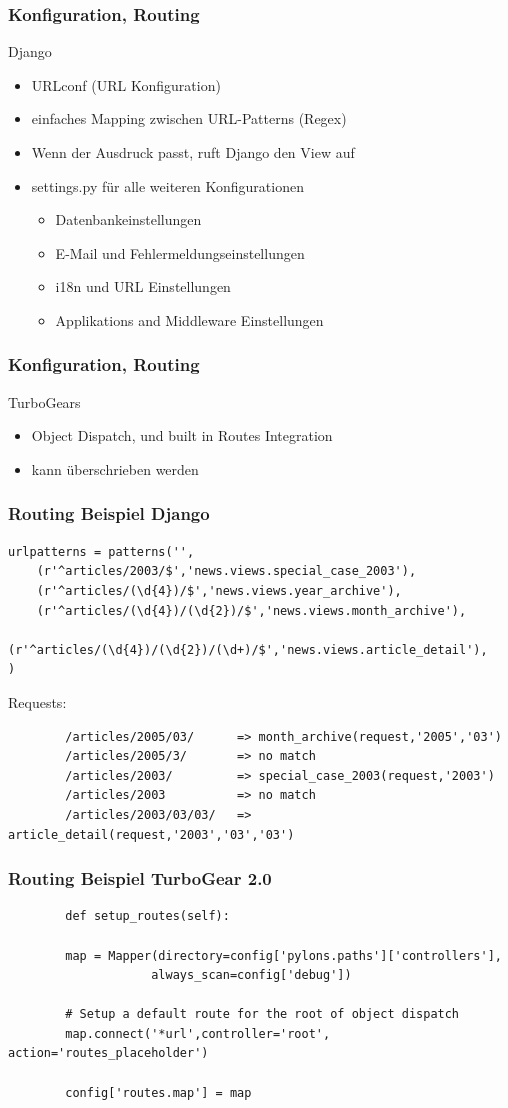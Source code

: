 \documentclass[
    t,
    smaller,
    compress,
]{beamer}
\begin{document}
\begin{frame}
  \frametitle{Konfiguration, Routing}
	Django
  	\begin{itemize}[<1->]
    	\item URLconf (URL Konfiguration)
    	\item einfaches Mapping zwischen URL-Patterns (Regex)
    	\item Wenn der Ausdruck passt, ruft Django den View auf
    	\item settings.py für alle weiteren Konfigurationen
    	\begin{itemize}[<1->]
    		\item Datenbankeinstellungen
    		\item E-Mail und Fehlermeldungseinstellungen
    		\item i18n und URL Einstellungen
    		\item Applikations and Middleware Einstellungen
    	\end{itemize}
  	 \end{itemize}
  	 
\end{frame}


\begin{frame}
  \frametitle{Konfiguration, Routing}
TurboGears
  	 \begin{itemize}[<1->]
    	\item Object Dispatch, und built in Routes Integration
    	\item kann überschrieben werden
 	\end{itemize}
\end{frame}  
\begin{frame}[fragile]
\frametitle{Routing Beispiel Django}
\begin{lstlisting}
urlpatterns = patterns('',
	(r'^articles/2003/$','news.views.special_case_2003'),
	(r'^articles/(\d{4})/$','news.views.year_archive'),
	(r'^articles/(\d{4})/(\d{2})/$','news.views.month_archive'),
	(r'^articles/(\d{4})/(\d{2})/(\d+)/$','news.views.article_detail'),
)
\end{lstlisting}
	Requests:
	\begin{lstlisting}
		/articles/2005/03/		=> month_archive(request,'2005','03')
		/articles/2005/3/		=> no match
		/articles/2003/			=> special_case_2003(request,'2003')
		/articles/2003			=> no match
		/articles/2003/03/03/	=> article_detail(request,'2003','03','03')
	\end{lstlisting}
\end{frame}
\begin{frame}[fragile]
\frametitle{Routing Beispiel TurboGear 2.0}
\begin{lstlisting}	
		def setup_routes(self):
		
		map = Mapper(directory=config['pylons.paths']['controllers'],
		            always_scan=config['debug'])
		
		# Setup a default route for the root of object dispatch
		map.connect('*url',controller='root', action='routes_placeholder')

		config['routes.map'] = map
\end{lstlisting}
\end{frame}
\end{document}
